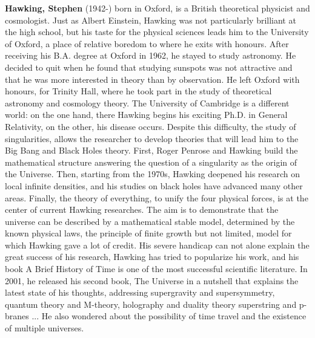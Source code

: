 \textbf{Hawking, Stephen} (1942-) born in Oxford, is a British theoretical physicist and cosmologist. Just as Albert Einstein, Hawking was not particularly brilliant at the high school, but his taste for the physical sciences leads him to the University of Oxford, a place of relative boredom to where he exits with honours. After receiving his B.A. degree at Oxford in 1962, he stayed to study astronomy. He decided to quit when he found that studying sunspots was not attractive and that he was more interested in theory than by observation. He left Oxford with honours, for Trinity Hall, where he took part in the study of theoretical astronomy and cosmology theory. The University of Cambridge is a different world: on the one hand, there Hawking begins his exciting Ph.D. in General Relativity, on the other, his disease occurs. Despite this difficulty, the study of singularities, allows the researcher to develop theories that will lead him to the Big Bang and Black Holes theory. First, Roger Penrose and Hawking build the mathematical structure answering the question of a singularity as the origin of the Universe. Then, starting from the 1970s, Hawking deepened his research on local infinite densities, and his studies on black holes have advanced many other areas. Finally, the theory of everything, to unify the four physical forces, is at the center of current Hawking researches. The aim is to demonstrate that the universe can be described by a mathematical stable model, determined by the known physical laws, the principle of finite growth but not limited, model for which Hawking gave a lot of credit. His severe handicap can not alone explain the great success of his research, Hawking has tried to popularize his work, and his book A Brief History of Time is one of the most successful scientific literature. In 2001, he released his second book, The Universe in a nutshell that explains the latest state of his thoughts, addressing supergravity and supersymmetry, quantum theory and M-theory, holography and duality theory superstring and p-branes ... He also wondered about the possibility of time travel and the existence of multiple universes.


